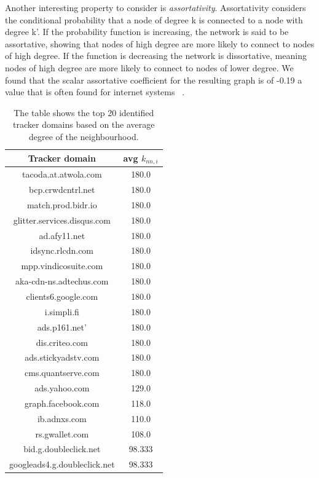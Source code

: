 Another interesting property to consider is \emph{assortativity}. Assortativity considers the conditional probability that a node of degree k is connected to a node with degree k'. If the probability function is increasing, the network is said to be assortative, showing that nodes of high degree are more likely to connect to nodes of high degree. If the function is decreasing the network is dissortative, meaning nodes of high degree are more likely to connect to nodes of lower degree. We found that the scalar assortative coefficient for the resulting graph is of -0.19 a value that is often found for internet systems ~\cite{noldus2015assortativity}.

\begin{table}[h!]
\centering
\begin{tabular}{ || c | c || }
\hline
Tracker domain & avg $k_{nn,i}$ \\
\hline
\hline
tacoda.at.atwola.com & 180.0 \\
bcp.crwdcntrl.net & 180.0 \\
match.prod.bidr.io & 180.0 \\
glitter.services.disqus.com & 180.0 \\
ad.afy11.net & 180.0 \\
idsync.rlcdn.com &180.0 \\
mpp.vindicosuite.com & 180.0 \\
aka-cdn-ns.adtechus.com & 180.0 \\
clients6.google.com & 180.0 \\
i.simpli.fi & 180.0 \\
ads.p161.net' & 180.0 \\
dis.criteo.com & 180.0 \\
ads.stickyadstv.com & 180.0 \\
cms.quantserve.com & 180.0 \\
ads.yahoo.com & 129.0 \\
graph.facebook.com & 118.0 \\
ib.adnxs.com & 110.0 \\
rs.gwallet.com & 108.0 \\
bid.g.doubleclick.net & 98.333\\
googleads4.g.doubleclick.net & 98.333\\
\hline
\end{tabular}
\\[2.5pt]
\caption{\label{table:trackers} The table shows the top 20 identified tracker domains based on the average degree of the neighbourhood.}
\end{table}

